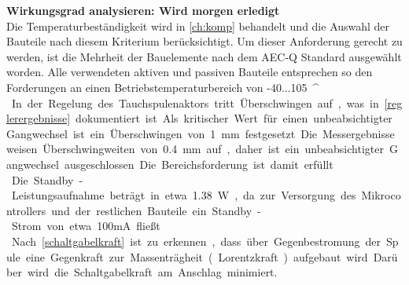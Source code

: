 \textbf{Wirkungsgrad analysieren: Wird morgen erledigt}\\
Die Temperaturbeständigkeit wird in \autoref{ch:komp} behandelt und die Auswahl der Bauteile nach diesem Kriterium berücksichtigt. Um dieser Anforderung gerecht zu werden, ist die Mehrheit der Bauelemente nach dem AEC-Q Standard ausgewählt worden. Alle verwendeten aktiven und passiven Bauteile entsprechen so den Forderungen an einen Betriebstemperaturbereich von -40...\SI{105}{^\circ}.\\
In der Regelung des Tauchspulenaktors tritt Überschwingen auf, was in \autoref{reglerergebnisse} dokumentiert ist. Als kritischer Wert für einen unbeabsichtigter Gangwechsel ist ein Überschwingen von \SI{1}{mm} festgesetzt. Die Messergebnisse weisen Überschwingweiten von \SI{0,4}{mm} auf, daher ist ein unbeabsichtigter Gangwechsel ausgeschlossen. Die Bereichsforderung ist damit erfüllt.\\
Die Standby-Leistungsaufnahme beträgt in etwa \SI{1,38}{W}, da zur Versorgung des Mikrocontrollers und der restlichen Bauteile ein Standby-Strom von etwa 100mA fließt.\\
Nach \autoref{schaltgabelkraft} ist zu erkennen, dass über Gegenbestromung der Spule eine Gegenkraft zur Massenträgheit (Lorentzkraft) aufgebaut wird. Darüber wird die Schaltgabelkraft am Anschlag minimiert.

